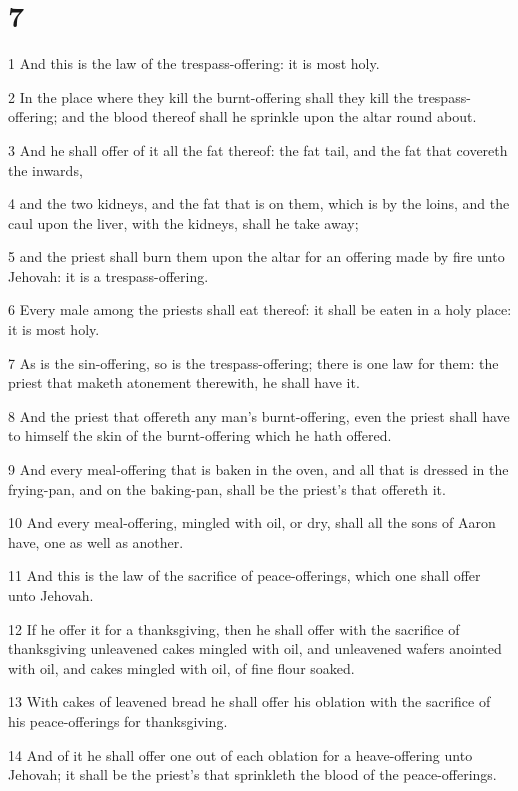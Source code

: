\chapter{7}

\par 1 And this is the law of the trespass-offering: it is most holy.
\par 2 In the place where they kill the burnt-offering shall they kill the trespass-offering; and the blood thereof shall he sprinkle upon the altar round about.
\par 3 And he shall offer of it all the fat thereof: the fat tail, and the fat that covereth the inwards,
\par 4 and the two kidneys, and the fat that is on them, which is by the loins, and the caul upon the liver, with the kidneys, shall he take away;
\par 5 and the priest shall burn them upon the altar for an offering made by fire unto Jehovah: it is a trespass-offering.
\par 6 Every male among the priests shall eat thereof: it shall be eaten in a holy place: it is most holy.
\par 7 As is the sin-offering, so is the trespass-offering; there is one law for them: the priest that maketh atonement therewith, he shall have it.
\par 8 And the priest that offereth any man's burnt-offering, even the priest shall have to himself the skin of the burnt-offering which he hath offered.
\par 9 And every meal-offering that is baken in the oven, and all that is dressed in the frying-pan, and on the baking-pan, shall be the priest's that offereth it.
\par 10 And every meal-offering, mingled with oil, or dry, shall all the sons of Aaron have, one as well as another.
\par 11 And this is the law of the sacrifice of peace-offerings, which one shall offer unto Jehovah.
\par 12 If he offer it for a thanksgiving, then he shall offer with the sacrifice of thanksgiving unleavened cakes mingled with oil, and unleavened wafers anointed with oil, and cakes mingled with oil, of fine flour soaked.
\par 13 With cakes of leavened bread he shall offer his oblation with the sacrifice of his peace-offerings for thanksgiving.
\par 14 And of it he shall offer one out of each oblation for a heave-offering unto Jehovah; it shall be the priest's that sprinkleth the blood of the peace-offerings.
